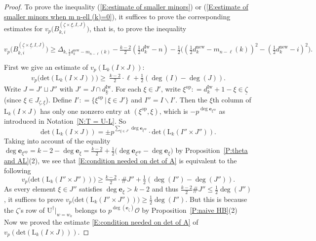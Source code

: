 \documentclass[12pt]{amsart}
\theoremstyle{definition}
\numberwithin{equation}{subsection}
\def\calO{\mathcal{O}}
\def\bfe{\mathbf{e}}
\def\rmL{\mathrm{L}}
\def\rmU{\mathrm{U}}
\newcommand{\op}{\mathrm{op}}
\newcommand{\new}{\mathrm{new}}
\newcommand{\Iw}{\mathrm{Iw}}
\renewcommand{\det}{\mathrm{det}}
\begin{document}
\begin{proof}
To prove the inequality (\ref{E:estimate of smaller minors}) or (\ref{E:estimate of smaller minors when m n-ell (k)=0}), it suffices to prove the corresponding estimates for $v_p\big(B^{(\underline \zeta \times \underline \xi,I, J)}_{k, i} \big)$, that is, to prove the inequality
        \begin{small}
		\begin{equation}
		\label{E:estimate of vp B zeta xi I J k i}
		v_p\big( B^{(\underline \zeta \times \underline \xi,I, J)}_{k, i}\big)\geq \Delta_{k,\frac 12 d_k^\new-m_{n-\ell}(k)}-\tfrac {k-2}2(\tfrac 12 d_k^\Iw-n)-\tfrac 12 \big((\tfrac 12 d_k^\new-m_{n-\ell}(k))^2-(\tfrac 12 d_k^\new-i)^2 \big).
\end{equation}\end{small}First we give an estimate of $v_p(\rmL_k(I\times J))$:
		\begin{align}
		\label{E:condition needed on det of A}
		v_p\big( \det (\rmL_k(I \times J))\big) \geq\ \tfrac{k-2}2 \cdot \ell+ \tfrac 12( \deg(I) - \deg(J)).
		\end{align}
Write $J = J'\sqcup J''$ with $J' = J \cap \underline{d_k^\Iw}$. For each $\xi \in J'$, write $\xi^\op : = d_k^\Iw+1-\xi \in \underline \zeta$ (since $\xi \in J_{\underline \zeta, \underline \xi}$).
Define $I' : = \{\xi^\op \,|\, \xi \in J'\}$ and $I'' =I \backslash I'$.
		Then the $\xi$th column of $\rmL_k(I \times J)$ has only one nonzero entry at $(\xi^\op, \xi)$, which is $-p^{\deg \bfe_{\xi^\op}}$ as introduced in Notation~\ref{N:T = U-L}. So
		$$
		\det(\rmL_k(I \times J)) = \pm p^{\sum_{\xi \in J'} \deg \bfe_{\xi^\op}} \cdot \det (\rmL_k(I'' \times J'')).
		$$
Taking into account of the equality $\deg \bfe_{\xi^\op} = k-2-\deg \bfe_\xi = \tfrac{k-2}2 + \tfrac 12\big(\deg \bfe_{\xi^\op} - \deg \bfe_\xi \big)$ by Proposition~\ref{P:theta and AL}(2), we see that  \eqref{E:condition needed on det of A} is equivalent to the following
		\begin{equation}
		\label{E:vpLk large}
		v_p\big( \det(\rmL_k(I'' \times J''))\big) \geq \tfrac{k-2}2\cdot \#J'' + \tfrac 12(\deg(I'')-\deg(J'')).
		\end{equation}
As every element $\xi \in J''$ satisfies $\deg \bfe_\xi > k-2$ and thus $\frac{k-2}2 \#J'' \leq \tfrac 12\deg(J'')$, it suffices to prove $v_p\big( \det(\rmL_k(I'' \times J''))\big) \geq \tfrac 12 \deg(I'')$. But this is because the $\zeta$'s row of $\rmU^\dagger|_{w = w_k}$ belongs to $p^{\deg (\bfe_\zeta)}\calO$ by Proposition~\ref{P:naive HB}(2)  Now we proved the estimate \eqref{E:condition needed on det of A} of $v_p(\det(\rmL_k(I\times J)))$.
        

\end{proof}
\end{document}
